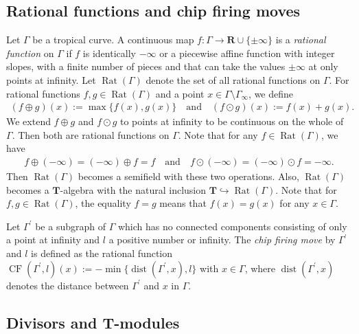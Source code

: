 \documentclass[a4paper,12pt]{amsart}
\def\Gamma{\varGamma}
\begin{document}
\subsection{Rational functions and chip firing moves}
    \label{subsection2.5}

Let $\Gamma$ be a tropical curve.
A continuous map $f : \Gamma \to \boldsymbol{R} \cup \{ \pm \infty \}$ is a \textit{rational function} on $\Gamma$ if $f$ is identically $-\infty$ or a piecewise affine function with integer slopes, with a finite number of pieces and that can take the values $\pm \infty$ at only points at infinity.
Let $\operatorname{Rat}(\Gamma)$ denote the set of all rational functions on $\Gamma$.
For rational functions $f, g \in \operatorname{Rat}(\Gamma)$ and a point $x \in \Gamma \setminus \Gamma_{\infty}$, we define
\begin{align*}
(f \oplus g) (x) := \operatorname{max}\{f(x), g(x)\} \quad \text{and} \quad (f \odot g) (x) := f(x) + g(x).
\end{align*}
We extend $f \oplus g$ and $f \odot g$ to points at infinity to be continuous on the whole of $\Gamma$.
Then both are rational functions on $\Gamma$.
Note that for any $f \in \operatorname{Rat}(\Gamma)$, we have
\begin{align*}
f \oplus (-\infty) = (-\infty) \oplus f = f \quad \text{and} \quad f \odot (-\infty) = (-\infty) \odot f = -\infty.
\end{align*}
Then $\operatorname{Rat}(\Gamma)$ becomes a semifield with these two operations.
Also, $\operatorname{Rat}(\Gamma)$ becomes a $\boldsymbol{T}$-algebra with the natural inclusion $\boldsymbol{T} \hookrightarrow \operatorname{Rat}(\Gamma)$.
Note that for $f, g \in \operatorname{Rat}(\Gamma)$, the equality $f = g$ means that $f(x) = g(x)$ for any $x \in \Gamma$.

Let $\Gamma^{\prime}$ be a subgraph of $\Gamma$ which has no connected components consisting of only a point at infinity and $l$ a positive number or infinity.
The \textit{chip firing move} by $\Gamma^{\prime}$ and $l$ is defined as the rational function $\operatorname{CF}(\Gamma^{\prime}, l)(x) := - \operatorname{min}\{ \operatorname{dist}(\Gamma^{\prime}, x), l \}$ with $x \in \Gamma$, where $\operatorname{dist}(\Gamma^{\prime}, x)$ denotes the distance between $\Gamma^{\prime}$ and $x$ in $\Gamma$.

\subsection{Divisors and \texorpdfstring{$\boldsymbol{T}$}{T}-modules}
    \label{subsection2.6}
\end{document}
